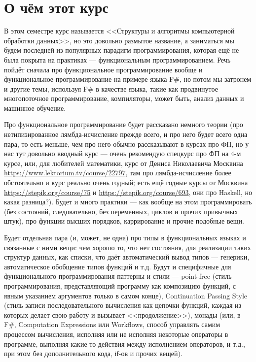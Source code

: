 \documentclass{../../text-style}
\begin{document}
\maketitle
\thispagestyle{empty}

\section{О чём этот курс}

В этом семестре курс называется <<Структуры и алгоритмы компьютерной обработки данных>>, но это довольно размытое название, а заниматься мы будем последней из популярных парадигм программирования, которая ещё не была покрыта на практиках --- функциональным программированием. Речь пойдёт сначала про функциональное программирование вообще и функциональное программирование на примере языка F\#, но потом мы затронем и другие темы, используя F\# в качестве языка, такие как продвинутое многопоточное программирование, компиляторы, может быть, анализ данных и машинное обучение.

Про функциональное программирование будет рассказано немного теории (про нетипизированное лямбда-исчисление прежде всего, и про него будет всего одна пара, то есть меньше, чем про него обычно рассказывают в курсах про ФП, но у нас тут довольно вводный курс --- очень рекомендую спецкурс про ФП на 4-м курсе, или, для любителей математики, курс от Дениса Николаевича Москвина \url{https://www.lektorium.tv/course/22797}, там про лямбда-исчисление более обстоятельно и курс реально очень годный; есть ещё годные курсы от Москвина \url{https://stepik.org/course/75} и \url{https://stepik.org/course/693}, они про Haskell, но какая разница?). Будет и много практики --- как вообще на этом программировать (без состояний, следовательно, без переменных, циклов и прочих привычных штук), про функции высших порядков, каррирование и прочие подобные вещи.

Будет отдельная пара (и, может, не одна) про типы в функциональных языках и связанные с ними вещи: чем хорошо то, что нет состояния, для реализации таких структур данных, как списки, что даёт автоматический вывод типов --- генерики, автоматическое обобщение типов функций и т.д. Будут и специфичные для функционального программирования паттерны и стили --- point-free (стиль программирования, представляющий программу как композицию функций, с явным указанием аргументов только в самом конце), Continuation Passing Style (стиль записи последовательного вычисления как цепочки функций, каждая из которых делает свою работу и вызывает <<продолжение>>), монады (или, в F\#, Computation Expressions или Workflows, способ управлять самим процессом вычисления, исполняя или не исполняя некоторые операторы в программе, выполняя какие-то действия между исполнением операторов, и т.д., при этом без дополнительного кода, if-ов и прочих вещей).
\end{document}
